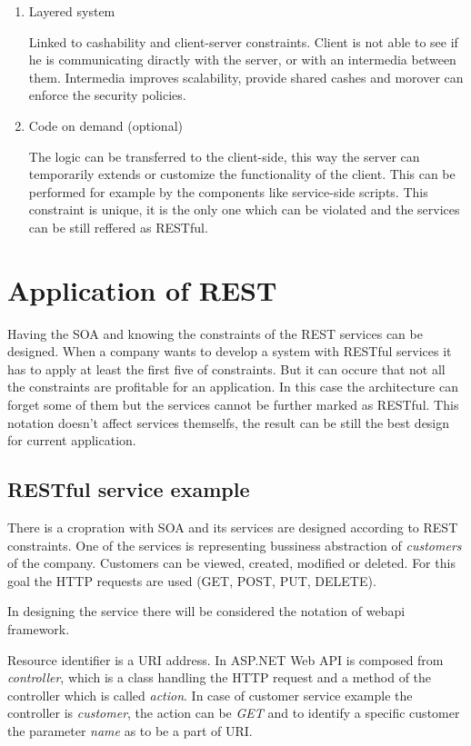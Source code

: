 \begin{description}
\begin{enumerate}
\item Layered system

Linked to cashability and client-server constraints. Client is not able to see if he is communicating diractly with the server, or with an intermedia between them. Intermedia improves scalability, provide shared cashes and morover can enforce the security policies.

\item Code on demand (optional)

The logic can be transferred to the client-side, this way the server can temporarily extends or customize the functionality of the client. This can be performed for example by the components like service-side scripts.
This constraint is unique, it is the only one which can be violated and the services can be still reffered as RESTful.

\end{enumerate}
\end{description}

\bigskip
\section{Application of REST}

Having the SOA and knowing the constraints of the REST services can be designed. When a company wants to develop a system with RESTful services it has to apply at least the first five of constraints. But it can occure that not all the constraints are profitable for an application. In this case the architecture can forget some of them but the services cannot be further marked as RESTful. This notation doesn't affect services themselfs, the result can be still the best design for current application.

\subsection{RESTful service example}
There is a cropration with SOA and its services are designed according to REST constraints. One of the services is representing bussiness abstraction of \emph{customers} of the company. Customers can be viewed, created, modified or deleted. For this goal the HTTP requests are used (GET, POST, PUT, DELETE). 

In designing the service there will be considered the notation of \gls{webapi} \gls{framework}. 

 

Resource identifier is a URI address. In ASP.NET Web API is composed from \emph{controller}, which is a class handling the HTTP request and a method of the controller which is called \emph{action}. In case of customer service example the controller is \emph{customer}, the action can be \emph{GET} and to identify a specific customer the parameter \emph{name} as to be a part of URI.

